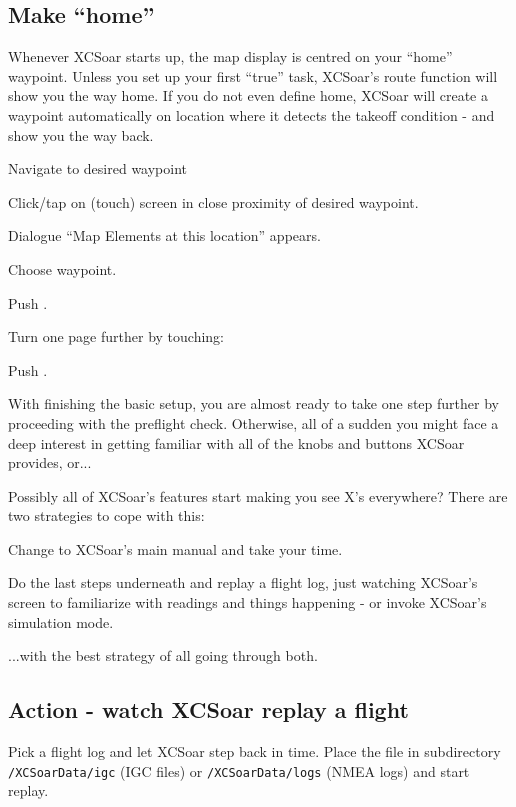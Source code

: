 \documentclass[english,a4paper,12pt]{refrep}
\begin{document}
\subsection{\textcolor{flashblue}{Make ``home''}}
Whenever XCSoar starts up, the map display is centred on your ``home'' 
waypoint. Unless you set up your first ``true'' task, XCSoar's route function will 
show you the way home. If you do not even define home, XCSoar will create a 
waypoint automatically on location where it detects the takeoff condition - and 
show you the way back.
\begin{compactitem}
\item Navigate to desired waypoint
\item Click/tap on (touch) screen in close proximity of desired waypoint.
\item Dialogue ``Map Elements at this location'' appears.
\item Choose waypoint.
\item Push .
\item Turn one page further by touching: \blink
\item Push .
\end{compactitem}

With finishing the basic setup, you are almost ready to take one step further 
by proceeding with the preflight check. Otherwise, all of a sudden you might 
face a deep interest in getting familiar with all of the knobs and buttons 
XCSoar provides, or...

Possibly all of XCSoar's features start making you see X's everywhere? There
are two strategies to cope with this:

\begin{compactitem}
\item Change to XCSoar's main manual and take your time.
\item Do the last steps underneath and replay a flight log, just watching 
XCSoar's screen to familiarize with readings and things happening - or invoke 
XCSoar's simulation mode.
\end{compactitem}

...with the best strategy of all going through both.

\subsection{\textcolor{flashblue}{Action - watch XCSoar replay a flight}}
Pick a flight log and let XCSoar step back in time.  Place the file in 
subdirectory \verb+/XCSoarData/igc+ (IGC files) or \verb+/XCSoarData/logs+
(NMEA logs) and start replay.
\end{document}
